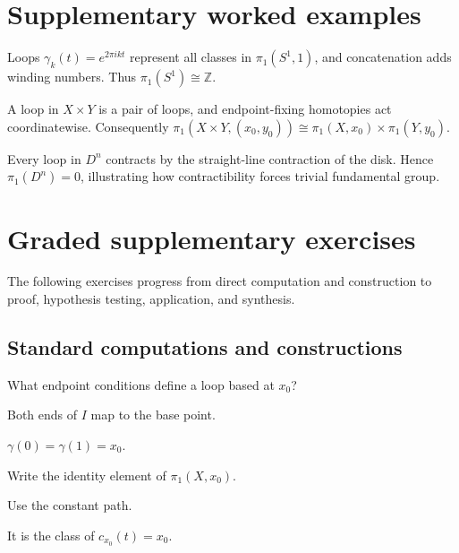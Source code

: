 \section{Supplementary worked examples}
\label{sec:viii09-pedagogy}

\begin{example}\label{ex:viii09-ped-01}
Loops $\gamma_k(t)=e^{2\pi i kt}$ represent all classes in $\pi_1(S^1,1)$, and concatenation adds winding numbers.  Thus $\pi_1(S^1)\cong\mathbb Z$.
\end{example}

\begin{example}\label{ex:viii09-ped-02}
A loop in $X\times Y$ is a pair of loops, and endpoint-fixing homotopies act coordinatewise.  Consequently $\pi_1(X\times Y,(x_0,y_0))\cong\pi_1(X,x_0)\times\pi_1(Y,y_0)$.
\end{example}

\begin{example}\label{ex:viii09-ped-03}
Every loop in $D^n$ contracts by the straight-line contraction of the disk.  Hence $\pi_1(D^n)=0$, illustrating how contractibility forces trivial fundamental group.
\end{example}

\section{Graded supplementary exercises}
The following exercises progress from direct computation and construction to proof, hypothesis testing, application, and synthesis.

\subsection*{Standard computations and constructions}

\begin{exercise}\label{exr:viii09-ped-01}
What endpoint conditions define a loop based at $x_0$?
\end{exercise}
\begin{hint}
Both ends of $I$ map to the base point.
\end{hint}
\begin{solution}
$\gamma(0)=\gamma(1)=x_0$.
\end{solution}

\begin{exercise}\label{exr:viii09-ped-02}
Write the identity element of $\pi_1(X,x_0)$.
\end{exercise}
\begin{hint}
Use the constant path.
\end{hint}
\begin{solution}
It is the class of $c_{x_0}(t)=x_0$.
\end{solution}

